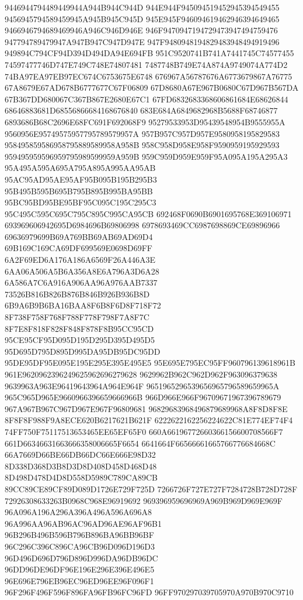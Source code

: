 9446944794489449944A944B944C944D
944E944F945094519452945394549455
9456945794589459945A945B945C945D
945E945F946094619462946394649465
9466946794689469946A946C946D946E
946F9470947194729473947494759476
947794789479947A947B947C947D947E
947F9480948194829483948494919496
949894C794CF94D394D494DA94E694FB
951C9520741B741A7441745C74577455
74597477746D747E749C748E74807481
7487748B749E74A874A9749074A774D2
74BA97EA97EB97EC674C6753675E6748
676967A56787676A6773679867A76775
67A8679E67AD678B6777677C67F06809
67D8680A67E967B0680C67D967B567DA
67B367DD680067C367B867E2680E67C1
67FD6832683368606861684E68626844
68646883681D68556866684168676840
683E684A6849682968B5688F68746877
6893686B68C2696E68FC691F692068F9
95279533953D95439548954B9555955A
9560956E95749575957795789579957A
957B957C957D957E9580958195829583
958495859586958795889589958A958B
958C958D958E958F9590959195929593
959495959596959795989599959A959B
959C959D959E959F95A095A195A295A3
95A495A595A695A795A895A995AA95AB
95AC95AD95AE95AF95B095B195B295B3
95B495B595B695B795B895B995BA95BB
95BC95BD95BE95BF95C095C195C295C3
95C495C595C695C795C895C995CA95CB
692468F0690B6901695768E369106971
693969606942695D6984696B69806998
6978693469CC6987698869CE69896966
69636979699B69A769BB69AB69AD69D4
69B169C169CA69DF699569E0698D69FF
6A2F69ED6A176A186A6569F26A446A3E
6AA06A506A5B6A356A8E6A796A3D6A28
6A586A7C6A916A906AA96A976AAB7337
73526B816B826B876B846B926B936B8D
6B9A6B9B6BA16BAA8F6B8F6D8F718F72
8F738F758F768F788F778F798F7A8F7C
8F7E8F818F828F848F878F8B95CC95CD
95CE95CF95D095D195D295D395D495D5
95D695D795D895D995DA95DB95DC95DD
95DE95DF95E095E195E295E395E495E5
95E695E795EC95FF960796139618961B
961E9620962396249625962696279628
9629962B962C962D962F963096379638
9639963A963E96419643964A964E964F
9651965296539656965796589659965A
965C965D965E9660966396659666966B
966D966E966F96709671967396789679
967A967B967C967D967E967F96809681
96829683968496879689968A8F8D8F8E
8F8F8F988F9A8ECE620B6217621B621F
6222622162256224622C81E774EF74F4
74FF750F75117513653465EE65EF65F0
660A66196772660366156600708566F7
661D66346631663666358006665F6654
6641664F66566661665766776684668C
66A7669D66BE66DB66DC66E666E98D32
8D338D368D3B8D3D8D408D458D468D48
8D498D478D4D8D558D5989C789CA89CB
89CC89CE89CF89D089D1726E729F725D
7266726F727E727F7284728B728D728F
72926308633263B0968C968E96919692
969396959696969A969B969D969E969F
96A096A196A296A396A496A596A696A8
96A996AA96AB96AC96AD96AE96AF96B1
96B296B496B596B796B896BA96BB96BF
96C296C396C896CA96CB96D096D196D3
96D496D696D796D896D996DA96DB96DC
96DD96DE96DF96E196E296E396E496E5
96E696E796EB96EC96ED96EE96F096F1
96F296F496F596F896FA96FB96FC96FD
96FF970297039705970A970B970C9710
